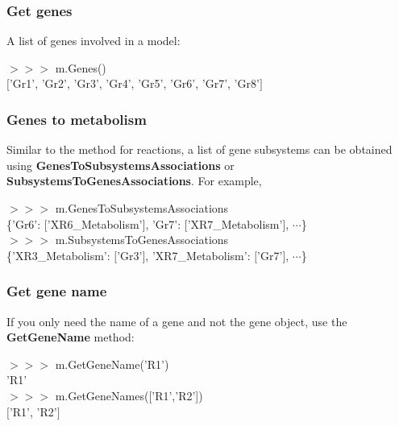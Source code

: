 \subsubsection{Get genes}

A list of genes involved in a model:

\begin{framed}
$>>>$ m.Genes()\\
$[$'Gr1', 'Gr2', 'Gr3', 'Gr4', 'Gr5', 'Gr6', 'Gr7', 'Gr8'$]$
\end{framed}


\subsubsection{Genes to metabolism}

Similar to the method for reactions, a list of gene subsystems can be obtained using \textbf{GenesToSubsystemsAssociations} or \textbf{SubsystemsToGenesAssociations}. For example,

\begin{framed}
$>>>$ m.GenesToSubsystemsAssociations\\
\{'Gr6': $[$'XR6\_Metabolism'$]$, 'Gr7': $[$'XR7\_Metabolism'], $\cdots$\}\\

$>>>$ m.SubsystemsToGenesAssociations\\
\{'XR3\_Metabolism': $[$'Gr3'$]$, 'XR7\_Metabolism': $[$'Gr7'$]$, $\cdots$\}
\end{framed}


\subsubsection{Get gene name}

If you only need the name of a gene and not the gene object, use the \textbf{GetGeneName} method:

\begin{framed}
$>>>$ m.GetGeneName('R1')\\
'R1'\\

$>>>$ m.GetGeneNames(['R1','R2'])\\
$[$'R1', 'R2'$]$
\end{framed}


